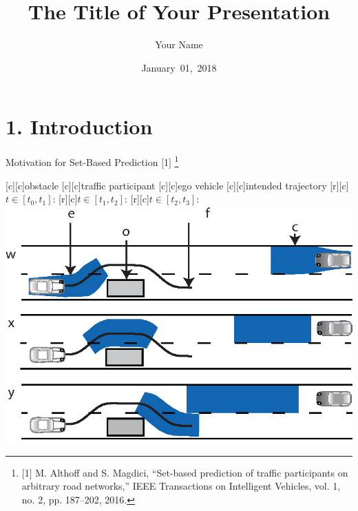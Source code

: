 \documentclass[shortpres,aspectratio=43]{beamer}
\title[Title]{The Title of Your Presentation}
\author[Name]{Your Name}
\institute[TU M\"unchen]{Technical University of Munich}
\date{January~01,~2018}
\newcommand\blfootnote[1]{%
  \begingroup
  \renewcommand\thefootnote{}\footnote{#1}%
  \addtocounter{footnote}{-1}%
  \endgroup
}
\begin{document}


\begin{frame}[plain]
    \titlepage
\end{frame}


\section{1. Introduction}

\begin{frame}{Motivation for Set-Based Prediction $[$1$]$}
\blfootnote{\tiny $[$1$]$ M. Althoff and S. Magdici, ``Set-based prediction of traffic participants on arbitrary road networks,'' IEEE Transactions on Intelligent Vehicles, vol. 1, no. 2, pp. 187--202, 2016.}

	\centering	
	\footnotesize
      [c][c]{obstacle}						
      [c][c]{traffic participant}
      [c][c]{ego vehicle}
      [c][c]{intended trajectory}      
      [r][c]{$t \in [t_0, t_1]$:}
      [r][c]{$t \in [t_1, t_2]$:}
      [r][c]{$t \in [t_2, t_3]$:}
      \includegraphics[width=0.8\columnwidth, height=0.74\textheight, keepaspectratio]{./figures/snapshots_blue.eps}
\end{frame}
\end{document}
